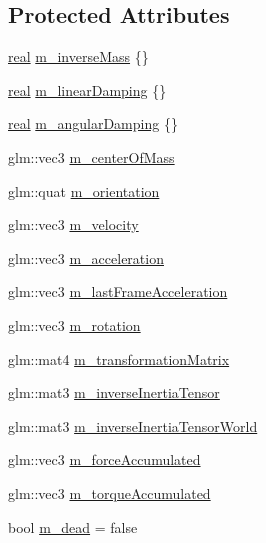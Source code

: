 \subsection*{Protected Attributes}
\begin{DoxyCompactItemize}
\item 
\mbox{\hyperlink{namespacerum_a7e8cca23573d5eaead0f138cbaa4862c}{real}} \mbox{\hyperlink{classrum_1_1_rigid_body_ae44a097e5f506fa92b4362fb7f3d1e34}{m\+\_\+inverse\+Mass}} \{\}
\item 
\mbox{\hyperlink{namespacerum_a7e8cca23573d5eaead0f138cbaa4862c}{real}} \mbox{\hyperlink{classrum_1_1_rigid_body_a1d4bf555e6b2f2bb856d4e0d54ee7578}{m\+\_\+linear\+Damping}} \{\}
\item 
\mbox{\hyperlink{namespacerum_a7e8cca23573d5eaead0f138cbaa4862c}{real}} \mbox{\hyperlink{classrum_1_1_rigid_body_ae4da76f319cb35a3d9c98ca3b6a49978}{m\+\_\+angular\+Damping}} \{\}
\item 
glm\+::vec3 \mbox{\hyperlink{classrum_1_1_rigid_body_af44c1d43b7ea38d7d4e80e85d7435856}{m\+\_\+center\+Of\+Mass}}
\item 
glm\+::quat \mbox{\hyperlink{classrum_1_1_rigid_body_ad6a5781f0de7e6389c4d77ed9b35d36a}{m\+\_\+orientation}}
\item 
glm\+::vec3 \mbox{\hyperlink{classrum_1_1_rigid_body_a48ac9b6ee9e5b953e811b9d53b5152c4}{m\+\_\+velocity}}
\item 
glm\+::vec3 \mbox{\hyperlink{classrum_1_1_rigid_body_a6ac55e43c61722e4cba0dac0a0a703b3}{m\+\_\+acceleration}}
\item 
glm\+::vec3 \mbox{\hyperlink{classrum_1_1_rigid_body_a781351881377ba7e431191d2c1967c7b}{m\+\_\+last\+Frame\+Acceleration}}
\item 
glm\+::vec3 \mbox{\hyperlink{classrum_1_1_rigid_body_ab28218707fc017407491826bb40a06e5}{m\+\_\+rotation}}
\item 
glm\+::mat4 \mbox{\hyperlink{classrum_1_1_rigid_body_ad3a0b17141b70e55f03a713f3892100e}{m\+\_\+transformation\+Matrix}}
\item 
glm\+::mat3 \mbox{\hyperlink{classrum_1_1_rigid_body_a2d280d2c778fe82a303d8495a71b3470}{m\+\_\+inverse\+Inertia\+Tensor}}
\item 
glm\+::mat3 \mbox{\hyperlink{classrum_1_1_rigid_body_a2d1996a62209043fe5c43a5bc275f912}{m\+\_\+inverse\+Inertia\+Tensor\+World}}
\item 
glm\+::vec3 \mbox{\hyperlink{classrum_1_1_rigid_body_a7e38f8a99d5dd102ea8496814048bcc0}{m\+\_\+force\+Accumulated}}
\item 
glm\+::vec3 \mbox{\hyperlink{classrum_1_1_rigid_body_a9d879f2a5d1430d4c16931bc6b96459d}{m\+\_\+torque\+Accumulated}}
\item 
bool \mbox{\hyperlink{classrum_1_1_rigid_body_aeca9c644919b9a8974e016cc1e8b9e71}{m\+\_\+dead}} = false
\end{DoxyCompactItemize}
